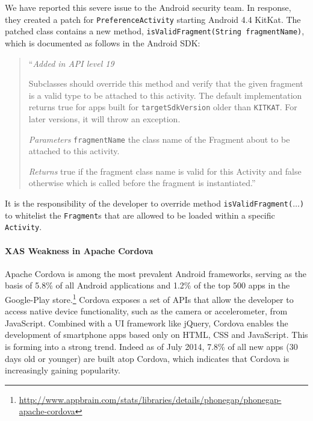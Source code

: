 
We have reported this severe issue to the Android security team. In response, they
created a patch for \texttt{PreferenceActivity} starting Android 4.4 KitKat. 
The patched class contains a new method, \texttt{isValidFragment(String fragmentName)}, 
which is documented as follows in the Android SDK:
\begin{quote}
	``\textit{Added in API level 19}
	
	Subclasses should override this method and verify that the given fragment
	is a valid type to be attached to this activity. The default implementation
	returns true for apps built for \texttt{targetSdkVersion}
	older than \texttt{KITKAT}. For later versions, it will throw an exception.
	
	\textit{Parameters} \texttt{fragmentName} the class name of the Fragment
	about to be attached to this activity. 
	
	\textit{Returns} true if the fragment class name is valid for this
	Activity and false otherwise which is called before the fragment is
	instantiated.'' 
\end{quote}
It is the responsibility of the developer to override method {\tt isValidFragment($\ldots$)} to whitelist the {\tt Fragment}s that are allowed to be loaded within a specific
{\tt Activity}.

\paragraph{XAS Weakness in Apache Cordova}\label{Se:CordovaXAS}

Apache Cordova is among the most prevalent Android frameworks, serving as the basis of 5.8\% of all Android applications and 1.2\% of the top 500 apps in the Google-Play store.\footnote{\url{http://www.appbrain.com/stats/libraries/details/phonegap/phonegap-apache-cordova}} Cordova exposes a set of APIs that allow the developer to access native device functionality, such as the camera or accelerometer, from JavaScript. Combined with a UI framework like jQuery, Cordova enables the development of smartphone apps based only
on HTML, CSS and JavaScript. This is forming into a strong trend. Indeed as of July 2014, 7.8\% of all new apps (30 days old or younger) are built atop Cordova, which indicates that Cordova is increasingly gaining popularity.

